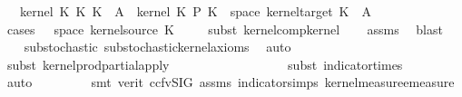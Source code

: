 \begin{isabellebody}
\ \ \ {\isachardoublequoteopen}kernel\ {\isacharparenleft}{\kern0pt}K\ {\isasymcirc}\isactrlsub K\ K\ {\isasymomega}\ A\ {\isacharequal}{\kern0pt}\ kernel\ {\isacharparenleft}{\kern0pt}K\ {\isasymOtimes}\isactrlsub P\ K\ {\isasymomega}\ {\isacharparenleft}{\kern0pt}space\ {\isacharparenleft}{\kern0pt}kernel{\isacharunderscore}{\kern0pt}target\ K\ {\isasymtimes}\ A\isanewline
%
\isadelimproof
\ \ %
\endisadelimproof
%
\isatagproof
{}\isamarkupfalse%
\ {\isacharparenleft}{\kern0pt}cases\ {\isachardoublequoteopen}{\isasymomega}\ {\isasymin}\ space\ {\isacharparenleft}{\kern0pt}kernel{\isacharunderscore}{\kern0pt}source\ K\isanewline
\ \ \ \isamarkupfalse%
\ {\isacharparenleft}{\kern0pt}subst\ kernel{\isacharunderscore}{\kern0pt}comp{\isacharunderscore}{\kern0pt}kernel{\isacharparenright}{\kern0pt}\isanewline
\ \ \isamarkupfalse%
\ assms\ \isamarkupfalse%
\ blast\isanewline
\ \ \isamarkupfalse%
\ substochastic\ substochastic{\isacharunderscore}{\kern0pt}kernel{\isachardot}{\kern0pt}axioms{\isacharparenleft}{\kern0pt}{}{\isacharparenright}{\kern0pt}\ \isamarkupfalse%
\ auto{\isacharbrackleft}{\kern0pt}{}{\isacharbrackright}{\kern0pt}\isanewline
\ \ \isamarkupfalse%
\ {\isacharparenleft}{\kern0pt}subst\ kernel{\isacharunderscore}{\kern0pt}prod{\isacharunderscore}{\kern0pt}partial{\isacharunderscore}{\kern0pt}apply{\isacharparenright}{\kern0pt}\isanewline
\ \ \ \ \ \ \ \isamarkupfalse%
\ {}\isanewline
\ \ \ \ \ \ \ \isamarkupfalse%
\ {\isacharparenleft}{\kern0pt}subst\ indicator{\isacharunderscore}{\kern0pt}times{\isacharparenright}{\kern0pt}\isanewline
\ \ \ \ \ \ \ \isamarkupfalse%
\ auto\isanewline
\ \ \ \ \ \ \ \isamarkupfalse%
\ {\isacharparenleft}{\kern0pt}smt\ {\isacharparenleft}{\kern0pt}verit{\isacharcomma}{\kern0pt}\ ccfv{\isacharunderscore}{\kern0pt}SIG{\isacharparenright}{\kern0pt}\ assms{\isacharparenleft}{\kern0pt}{}{\isacharparenright}{\kern0pt}\ indicator{\isacharunderscore}{\kern0pt}simps{\isacharparenleft}{\kern0pt}{}{\isacharparenright}{\kern0pt}\ kernel{\isacharunderscore}{\kern0pt}measure{\isacharunderscore}{\kern0pt}emeasure\isanewline

\end{isabellebody}

